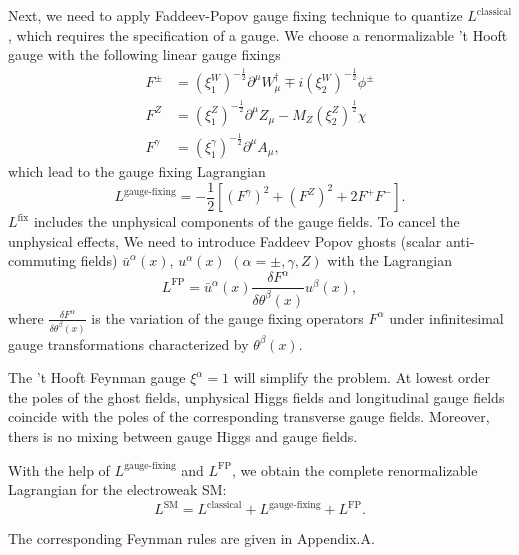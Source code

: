 Next, we need to apply Faddeev-Popov gauge fixing technique\cite{PF,PF1} to quantize 
$L^\text{classical}$, which requires the specification of a gauge. We choose a renormalizable 't Hooft gauge with the following linear gauge fixings
\begin{align}
F^\pm&=(\xi_1^W)^{-\frac{1}{2}}\partial^\mu W_\mu^\dagger\mp i(\xi_2^W)^{-\frac{1}{2}} \phi^\pm\nonumber\\
F^Z&=(\xi_1^Z)^{-\frac{1}{2}}\partial^\mu Z_\mu- M_Z(\xi_2^Z)^{\frac{1}{2}}\chi\nonumber\\
F^\gamma&=(\xi_1^\gamma)^{-\frac{1}{2}}\partial^\mu A_\mu,
\end{align}
which lead to the gauge fixing Lagrangian
\begin{equation}
L^\text{gauge-fixing}=-\frac{1}{2}[(F^\gamma)^2+(F^Z)^2+2F^+ F^-].
\end{equation}
$L^\text{fix}$ includes the unphysical components of the gauge fields. To cancel the unphysical effects, We need to introduce Faddeev Popov ghosts (scalar anti-commuting fields) $\bar{u}^\alpha(x)$, $u^\alpha(x)$ $(\alpha=\pm, \gamma, Z)$ with the Lagrangian 
\begin{equation}
L^\text{FP} = \bar{u}^\alpha(x)\frac{\delta F^\alpha}{\delta \theta^\beta(x)}u^\beta(x),
\end{equation}
where $\frac{\delta F^\alpha}{\delta \theta^\beta(x)}$ is the variation of the gauge fixing operators $F^\alpha$ under infinitesimal gauge transformations characterized by $\theta^\beta(x)$.

The 't Hooft Feynman gauge $\xi^\alpha=1$ will simplify the problem. At lowest order the poles of the ghost fields, unphysical Higgs fields and longitudinal gauge fields coincide with the poles of the corresponding transverse gauge fields. Moreover, thers is no mixing between gauge Higgs and gauge fields.

With the help of $L^\text{gauge-fixing}$ and $L^\text{FP}$, we obtain the complete renormalizable Lagrangian for the electroweak SM:
\begin{equation}
L^{\text{SM}}=L^\text{classical}+L^\text{gauge-fixing}+L^\text{FP}.
\end{equation} 

The corresponding Feynman rules are given in Appendix.A.
\newpage
